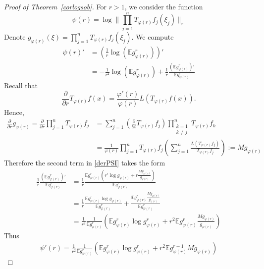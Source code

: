 \documentclass[9pt, a4paper]{amsart}
\newcommand{\1}{{\chi_{}}}%
\numberwithin{equation}{section}
\begin{document}
\begin{proof}[Proof of Theorem~\ref{corlogsob}]
For $r>1$, we consider the function
\begin{equation}
\psi(r)=\log \|\prod_{j=1}^nT_{\varphi(r)}f_j(\xi_j)\|_{r}
\end{equation}
Denote $g_{\varphi(r)}(\xi)=\prod_{j=1}^nT_{\varphi(r)}f_j(\xi_j)$. We compute
\begin{align}\label{derPSI}
\nonumber\psi(r)'&=\left( \frac{1}{r}\log\left(\mathbb{E}g_{\varphi(r)}^{r}\right) \right)'\\
&=-\frac{1}{r^2}\log\left(\mathbb{E} g_{\varphi(r)}^{r}\right)+\frac{1}{r}\frac{\left(\mathbb{E}g_{\varphi(r)}^{r}\right)'}{\mathbb{E}g_{\varphi(r)}^{r}}
\end{align}
Recall that
\begin{equation*}
\frac{\partial}{\partial r}T_{\varphi(r)}f(x)=\frac{\varphi'(r)}{\varphi(r)}L(T_{\varphi(r)}f(x)).
\end{equation*}
Hence,
\begin{align*}
\frac{\partial}{\partial r}g_{\varphi(r)}=\frac{\partial}{\partial r}\prod_{j=1}^nT_{\varphi(r)}f_j&=\sum_{j=1}^{n} \left( \frac{\partial}{\partial t} T_{\varphi(r)} f_j \right) \prod_{\substack{k=1 \\ k \neq j}}^{n} T_{\varphi(r)} f_k\\
&=\frac{1}{\varphi(r)}\prod_{j=1}^nT_{\varphi(r)}f_j\left( \sum_{j=1}^n
\frac{L(T_{\varphi(r)}f_j)}{T_{\varphi(r)}f_j}\right):=Mg_{\varphi(r)}
\end{align*}
Therefore the second term in \eqref{derPSI} takes the form
\begin{align*}
\frac{1}{r}\frac{\left(\mathbb{E} g_{\varphi(r)}^{r}\right)'}{\mathbb{E} g_{\varphi(r)}^{r}}&=\frac{1}{r}\frac{\mathbb{E}g_{\varphi(r)}^{r}(r'\log g_{\varphi(r)}+r\frac{Mg_{\varphi(r)}}{g_{\varphi(r)}})}{\mathbb{E} g_{\varphi(r)}^{r}}\\
&=\frac{1}{r}\frac{\mathbb{E}g_{\varphi(r)}^{r}\log g_{\varphi(r)}}{\mathbb{E} g_{\varphi(r)}^{r}}+\frac{\mathbb{E}g_{\varphi(r)}^{r}\frac{Mg_{\varphi(r)}}{g_{\varphi(r)}}}{\mathbb{E} g_{\varphi(r)}^{r}}\\
&=\frac{1}{r^2} \frac{1}{\mathbb{E} g_{\varphi(r)}^{r}} \left( \mathbb{E}g_{\varphi(r)}^{r}\log g_{\varphi(r)}^{r} + r^2\mathbb{E}g_{\varphi(r)}^{r}\frac{Mg_{\varphi(r)}}{g_{\varphi(r)}}\right)
\end{align*}
Thus
\begin{align*}
    \psi'(r)=\frac{1}{r^2} \frac{1}{\mathbb{E} g_{\varphi(r)}^{r}} \left(\mathbb{E}g_{\varphi(r)}^{r}\log g_{\varphi(r)}^{r} +r^2 \mathbb{E}g_{\varphi(r)}^{r-1}Mg_{\varphi(r)}\right)

\end{align*}
\end{proof}
\end{document}
